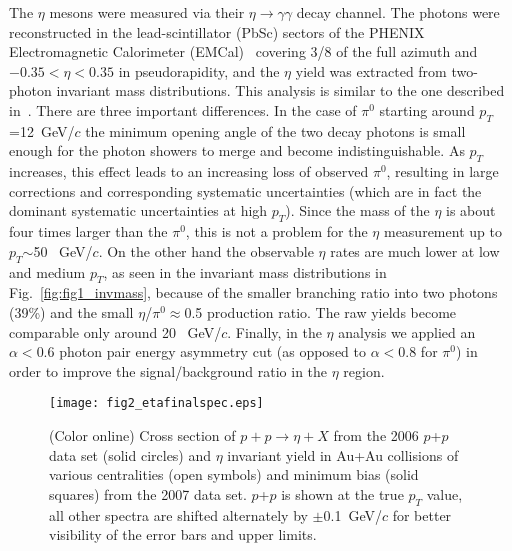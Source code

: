 \documentclass[aps,prc,superscriptaddress,showpacs,nofootinbib,floatfix,twocolumn]{revtex4}
\def\pt{$p_T$}
\def\pts{$p_T$ }
\def\gevc{~GeV/$c$}
\def\gevcs{~GeV/$c$ }
\def\pp{$p$+$p$ }
\def\piz{$\pi^{0}$}
\def\pizs{$\pi^{0}$ }
\def\h{$\eta$}
\def\hs{$\eta$ }
\begin{document}
The \hs mesons were measured via their $\eta\rightarrow\gamma\gamma$ 
decay channel.  The photons were reconstructed in the 
lead-scintillator (PbSc) sectors of the PHENIX Electromagnetic 
Calorimeter (EMCal)~\cite{nimemc} covering 3/8 of the full azimuth and 
$-0.35<\eta<0.35$ in pseudorapidity, and the \hs yield was extracted 
from two-photon invariant mass distributions.  This analysis is 
similar to the one described in~\cite{ppg055,ppg054}.  There are three 
important differences.  In the case of \pizs starting around 
\pt=12\gevcs the minimum opening angle of the two decay photons is 
small enough for the photon showers to merge and become 
indistinguishable.  As \pts increases, this effect leads to an 
increasing loss of observed \piz, resulting in large corrections and 
corresponding systematic uncertainties (which are in fact the dominant 
systematic uncertainties at high \pt).  Since the mass of the \hs is 
about four times larger than the \piz, this is not a problem for the 
\hs measurement up to \pt$\sim$50 \gevc.  On the other hand the 
observable \hs rates are much lower at low and medium \pt, as seen in 
the invariant mass distributions in Fig.~\ref{fig:fig1_invmass}, 
because of the smaller branching ratio into two photons (39\%) and the 
small \h/\piz$\approx$0.5 production ratio.  The raw yields become 
comparable only around 20 \gevc.  Finally, in the \hs analysis we 
applied an $\alpha<0.6$ photon pair energy asymmetry cut (as opposed 
to $\alpha<0.8$ for \piz) in order to improve the signal/background 
ratio in the \hs region.

\begin{figure}[tb]
\texttt{[image: fig2\_etafinalspec.eps]}
\caption{\label{fig:fig2_etafinalspec} (Color online) Cross 
section of $p+p\rightarrow\eta+X$ from the 2006 \pp data set (solid
circles) and \hs invariant yield in Au+Au collisions of various
centralities (open symbols) and minimum bias (solid squares) 
from the 2007 data set.  \pp is shown at the true \pts value, all
other spectra are shifted alternately by $\pm$0.1\gevcs for better
visibility of the error bars and upper limits.}
\end{figure}
\end{document}
